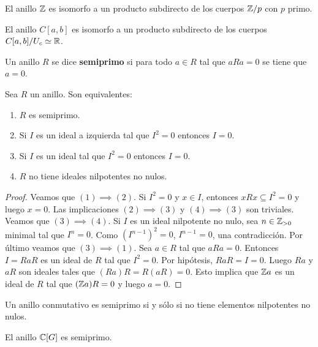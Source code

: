 \begin{example}
	El anillo $\mathbb{Z}$ es isomorfo a un producto subdirecto de los cuerpos $\mathbb{Z}/p$
	con $p$ primo.
\end{example}

\begin{example}
	El anillo $C[a,b]$ es isomorfo a un producto subdirecto de los cuerpos
	$C[a,b]/U_c\simeq\mathbb{R}$.
\end{example}

\begin{definition}
	Un anillo $R$ se dice \textbf{semiprimo} si para todo $a\in R$ tal que
	$aRa=0$ se tiene que $a=0$.
\end{definition}

\begin{lemma}
	Sea $R$ un anillo. Son equivalentes:
	\begin{enumerate}
		\item $R$ es semiprimo.
		\item Si $I$ es un ideal a izquierda tal que $I^2=0$ entonces $I=0$.
		\item Si $I$ es un ideal tal que $I^2=0$ entonces $I=0$.
		\item $R$ no tiene ideales nilpotentes no nulos. 
	\end{enumerate}
\end{lemma}

\begin{proof}
	Veamos que $(1)\implies(2)$. Si $I^2=0$ y $x\in I$, entonces $xRx\subseteq I^2=0$ y
	luego $x=0$. Las implicaciones $(2)\implies(3)$ y $(4)\implies(3)$ son triviales. Veamos que
	$(3)\implies(4)$.  Si $I$ es un ideal nilpotente no nulo, sea $n\in\mathbb{Z}_{>0}$ 
	minimal tal que $I^n=0$.  Como $(I^{n-1})^2=0$, $I^{n-1}=0$, una
	contradicción. Por último veamos que $(3)\implies(1)$. Sea $a\in R$ tal que
	$aRa=0$. Entonces $I=RaR$ es un ideal de $R$ tal que $I^2=0$. Por hipótesis, $RaR=I=0$. Luego
	$Ra$ y $aR$ son ideales tales que $(Ra)R=R(aR)=0$. Esto implica que $\mathbb{Z} a$ es un ideal de $R$
	tal que $(\mathbb{Z} a)R=0$ y luego $a=0$.
\end{proof}

\begin{example}
	Un anillo conmutativo es semiprimo si y sólo si no tiene elementos
	nilpotentes no nulos.
\end{example}


\begin{proposition}
	El anillo $\mathbb{C}[G]$ es semiprimo.
\end{proposition}

